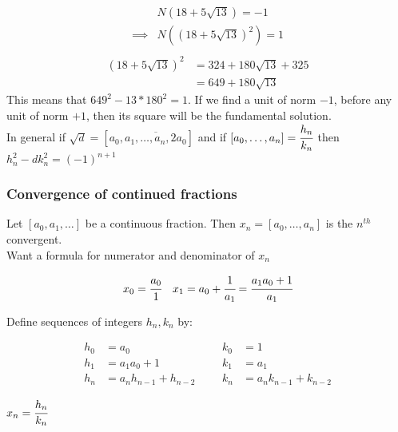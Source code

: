 \documentclass[11pt]{article}
\begin{document}
\begin{align*}
	& N(18+5\sqrt{13})=-1 \\
	\implies & N( (18+5\sqrt{13})^2) = 1\\[2em]
\end{align*}
\vspace{-5em}
\begin{align*}
	(18+5\sqrt{13})^2 &= 324+180\sqrt{13}+325\\
	&= 649+180\sqrt{13}
\end{align*}
This means that $649^2-13*180^2 = 1$. If we find a unit of norm $-1$, before any unit of norm $+1$, then its square will be the fundamental solution. 
$ $\\[1em]
In general if $\sqrt{d} = [a_0,\overline{a_1,\dots,a_n,2a_0 }]$ and if $[a_0,\dots,a_n] = \cfrac{h_n}{k_n}$ \hspace{4pt}then $h_n^2-dk_n^2 = (-1)^{n+1}$




\subsubsection{Convergence of continued fractions}


Let $[a_0,a_1,\dots ]$ be a continuous fraction. Then $x_n = [a_0,\dots, a_n] $ is the $n^{th}$ convergent.\\

Want a formula for numerator and denominator of $x_n$

\begin{align*}
	x_0 = \cfrac{a_0}{1} && x_1 = a_0 + \cfrac{1}{a_1}= \cfrac{a_1a_0+1}{a_1}
\end{align*}

Define sequences of integers $h_n,k_n$ by:

\begin{align*}
	h_0&=a_0 &&& k_0&=1\\
	h_1&=a_1a_0 + 1 &&& k_1&=a_1\\
	h_n &= a_n h_{n-1} + h_{n-2} &&& k_n&=a_nk_{n-1}+k_{n-2}
\end{align*}



\begin{lemma}
	$x_n = \cfrac{h_n}{k_n}$
\end{lemma}
\end{document}
